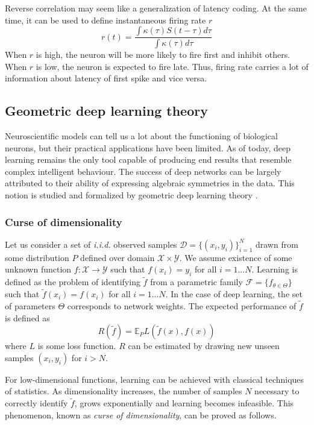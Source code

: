 \documentclass[12pt]{article}
\begin{document}
Reverse correlation may seem like a generalization of latency coding. At the same time, it can be used to define instantaneous firing rate $r$
\[
r(t) = \frac{\int \kappa(\tau) S(t-\tau)d\tau}{\int \kappa(\tau) d\tau}
\]
When $r$ is high, the neuron will be more likely to fire first and inhibit others. When $r$ is low, the neuron is expected to fire late. Thus, firing rate carries a lot of information about latency of first spike and vice versa.

\subsection{Geometric deep learning theory}

Neuroscientific models can tell us a lot about the functioning of biological neurons, but their practical applications have been limited. As of today, deep learning remains the only tool capable of producing end results that resemble complex intelligent behaviour.
The success of deep networks can be largely attributed to their ability of expressing algebraic symmetries in the data. This notion is studied and formalized by geometric deep learning theory \cite{geom_deep_learn}.

\subsubsection{Curse of dimensionality}

Let us consider a set of \textit{i.i.d.} observed samples $\mathcal{D}=\{(x_i,y_i)\}_{i=1}^N$ drawn from some distribution $P$ defined over domain $\mathcal{X}\times \mathcal{Y}$. We assume existence of some unknown function $f:\mathcal{X}\rightarrow\mathcal{Y}$ such that $f(x_i)=y_i$ for all $i=1...N$. Learning is defined as the problem of identifying $\tilde{f}$ from a parametric family $\mathcal{F}=\{f_{\theta\in\Theta}\}$ such that $\tilde{f}(x_i)=f(x_i)$ for all $i=1...N$. In the case of deep learning, the set of parameters $\Theta$ corresponds to network weights. The expected performance  of $\tilde{f}$ is defined as 
\[
R(\tilde{f})=\mathbb{E}_{P} L(\tilde{f}(x),f(x))
\]
where $L$ is some loss function. $R$ can be estimated by drawing new unseen samples $(x_i,y_i)$ for $i>N$.

For low-dimensional functions, learning can be achieved with classical techniques of statistics. As dimensionality increases, the number of samples $N$  necessary to correctly identify $\tilde{f}$, grows exponentially and learning becomes infeasible. This phenomenon, known as \textit{curse of dimensionality}, can be proved as follows.
\end{document}
